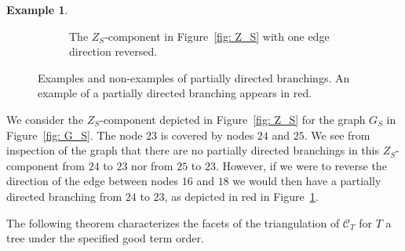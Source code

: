 \documentclass[11pt]{article}
\theoremstyle{definition}
\newtheorem{example}[theo]{Example}
\numberwithin{equation}{section}
\begin{document}
\begin{example}
\begin{figure}
\begin{subfigure}[b]{0.45\textwidth}
         \caption{The $Z_S$-component in Figure~\ref{fig: Z_S} with one edge direction reversed.}
         \label{fig: Z_S aug}
     \end{subfigure}
        \caption{Examples and non-examples of partially directed branchings.  An example of a partially directed branching appears in red.}
        \label{fig: covers and branching}
\end{figure}

    We consider the $Z_S$-component depicted in Figure~\ref{fig: Z_S} for the graph $G_S$ in Figure~\ref{fig: G_S}.
    The node $23$ is covered by nodes $24$ and $25$. We see from inspection of the graph that there are no partially directed branchings in this $Z_S$-component from $24$ to $23$ nor from $25$ to $23$.  
    However, if we were to reverse the direction of the edge between nodes $16$ and $18$ we would then have a partially directed branching from $24$ to $23$, as depicted in red in Figure~\ref{fig: Z_S aug}.
\end{example}

The following theorem characterizes the facets of the triangulation of $\mathcal{C}_T$ for $T$ a tree under the specified good term order.
\end{document}
